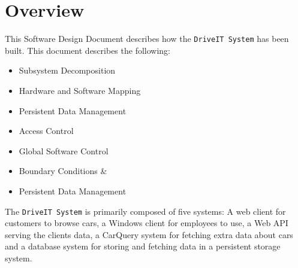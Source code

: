 \section{Overview}
This Software Design Document describes how the \texttt{DriveIT System} has been built.
This document describes the following:
\begin{itemize}
	\item Subsystem Decomposition
	\item Hardware and Software Mapping
	\item Persistent Data Management
	\item Access Control
	\item Global Software Control
	\item Boundary Conditions \&
	\item Persistent Data Management
\end{itemize}

The \texttt{DriveIT System} is primarily composed of five systems: 
A web client for customers to browse cars, a Windows client for employees to use, a Web API serving the clients data, a CarQuery system for fetching extra data about cars and a database system for storing and fetching data in a persistent storage system.